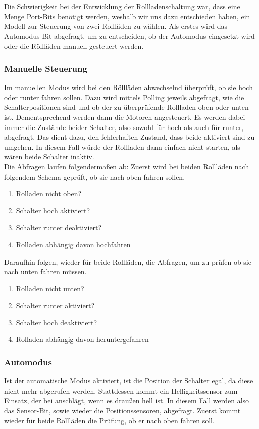 Die Schwierigkeit bei der Entwicklung der Rollladenschaltung war, dass eine Menge Port-Bits benötigt werden, weshalb wir uns dazu entschieden haben, ein Modell zur Steuerung von zwei Rollläden zu wählen. Als erstes wird das Automodus-Bit abgefragt, um zu entscheiden, ob der Automodus eingesetzt wird oder die Röllläden manuell gesteuert werden.
\subsubsection{Manuelle Steuerung}
Im manuellen Modus wird bei den Röllläden abwechselnd überprüft, ob sie hoch oder runter fahren sollen. Dazu wird mittels Polling jeweils abgefragt, wie die Schalterpositionen sind und ob der zu überprüfende Rollladen oben oder unten ist. Dementsprechend werden dann die Motoren angesteuert. Es werden dabei immer die Zustände beider Schalter, also sowohl für hoch als auch für runter, abgefragt. Das dient dazu, den fehlerhaften Zustand, dass beide aktiviert sind zu umgehen. In diesem Fall würde der Rollladen dann einfach nicht starten, als wären beide Schalter inaktiv. \\
Die Abfragen laufen folgendermaßen ab:
Zuerst wird bei beiden Rollläden nach folgendem Schema geprüft, ob sie nach oben fahren sollen.
\begin{enumerate}
\item{Rolladen nicht oben?}
\item{Schalter hoch aktiviert?}
\item{Schalter runter deaktiviert?}
\item{Rolladen abhängig davon hochfahren}
\end{enumerate}
Daraufhin folgen, wieder für beide Rollläden, die Abfragen, um zu prüfen ob sie nach unten fahren müssen.
\begin{enumerate}
\item{Rolladen nicht unten?}
\item{Schalter runter aktiviert?}
\item{Schalter hoch deaktiviert?}
\item{Rolladen abhängig davon heruntergefahren}
\end{enumerate}

\subsubsection{Automodus}
Ist der automatische Modus aktiviert, ist die Position der Schalter egal, da diese nicht mehr abgerufen werden. Stattdessen kommt ein Helligkeitssensor zum Einsatz, der bei anschlägt, wenn es draußen hell ist. In diesem Fall werden also das Sensor-Bit, sowie wieder die Positionssensoren, abgefragt.
Zuerst kommt wieder für beide Rollläden die Prüfung, ob er nach oben fahren soll.

